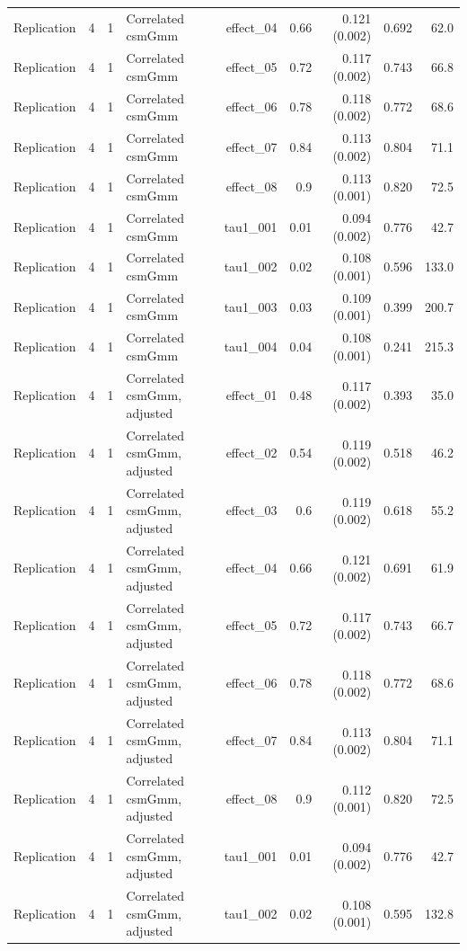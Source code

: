 \begin{longtable}{lcclrrrrr}
Replication & 4 & 1 & Correlated csmGmm & effect\_04 & 0.66 & 0.121 (0.002) & 0.692 & 62.0\\
Replication & 4 & 1 & Correlated csmGmm & effect\_05 & 0.72 & 0.117 (0.002) & 0.743 & 66.8\\
Replication & 4 & 1 & Correlated csmGmm & effect\_06 & 0.78 & 0.118 (0.002) & 0.772 & 68.6\\
Replication & 4 & 1 & Correlated csmGmm & effect\_07 & 0.84 & 0.113 (0.002) & 0.804 & 71.1\\
Replication & 4 & 1 & Correlated csmGmm & effect\_08 & 0.9 & 0.113 (0.001) & 0.820 & 72.5\\
Replication & 4 & 1 & Correlated csmGmm & tau1\_001 & 0.01 & 0.094 (0.002) & 0.776 & 42.7\\
Replication & 4 & 1 & Correlated csmGmm & tau1\_002 & 0.02 & 0.108 (0.001) & 0.596 & 133.0\\
Replication & 4 & 1 & Correlated csmGmm & tau1\_003 & 0.03 & 0.109 (0.001) & 0.399 & 200.7\\
Replication & 4 & 1 & Correlated csmGmm & tau1\_004 & 0.04 & 0.108 (0.001) & 0.241 & 215.3\\
Replication & 4 & 1 & Correlated csmGmm, adjusted & effect\_01 & 0.48 & 0.117 (0.002) & 0.393 & 35.0\\
Replication & 4 & 1 & Correlated csmGmm, adjusted & effect\_02 & 0.54 & 0.119 (0.002) & 0.518 & 46.2\\
Replication & 4 & 1 & Correlated csmGmm, adjusted & effect\_03 & 0.6 & 0.119 (0.002) & 0.618 & 55.2\\
Replication & 4 & 1 & Correlated csmGmm, adjusted & effect\_04 & 0.66 & 0.121 (0.002) & 0.691 & 61.9\\
Replication & 4 & 1 & Correlated csmGmm, adjusted & effect\_05 & 0.72 & 0.117 (0.002) & 0.743 & 66.7\\
Replication & 4 & 1 & Correlated csmGmm, adjusted & effect\_06 & 0.78 & 0.118 (0.002) & 0.772 & 68.6\\
Replication & 4 & 1 & Correlated csmGmm, adjusted & effect\_07 & 0.84 & 0.113 (0.002) & 0.804 & 71.1\\
Replication & 4 & 1 & Correlated csmGmm, adjusted & effect\_08 & 0.9 & 0.112 (0.001) & 0.820 & 72.5\\
Replication & 4 & 1 & Correlated csmGmm, adjusted & tau1\_001 & 0.01 & 0.094 (0.002) & 0.776 & 42.7\\
Replication & 4 & 1 & Correlated csmGmm, adjusted & tau1\_002 & 0.02 & 0.108 (0.001) & 0.595 & 132.8\\

\end{longtable}
